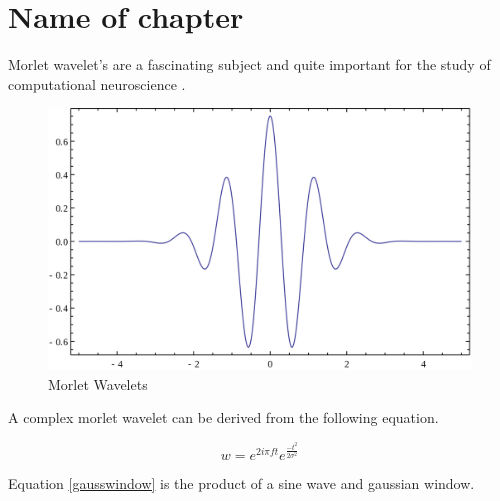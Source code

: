 \chapter{Name of chapter}

\lipsum[1] %

Morlet wavelet's are a fascinating subject and quite important for the study of computational neuroscience \cite{COHEN2019}.



\begin{figure}[h]
    \centering
    \includegraphics[scale=0.2]{figures/morlet_wavelet.png}
    \caption{Morlet Wavelets}
    \label{fig:morlet}
\end{figure}

A complex morlet wavelet can be derived from the following equation.

\begin{equation}
\label{gausswindow}
    w=e^{2i \pi ft}e^\frac{-t^2}{2\sigma^2}
\end{equation}

Equation \ref{gausswindow} is the product of a sine wave and gaussian window.


